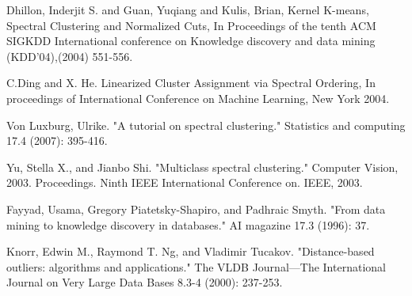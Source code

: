 \begin{thebibliography}{9}
Dhillon, Inderjit S. and Guan, Yuqiang and Kulis, Brian, Kernel K-means, Spectral Clustering and Normalized Cuts, In Proceedings of the tenth ACM SIGKDD International conference on Knowledge discovery and data mining (KDD’04),(2004) 551-556.

C.Ding and X. He. Linearized Cluster Assignment via Spectral Ordering, In proceedings of International Conference on Machine Learning, New York 2004.

Von Luxburg, Ulrike. "A tutorial on spectral clustering." Statistics and computing 17.4 (2007): 395-416.

Yu, Stella X., and Jianbo Shi. "Multiclass spectral clustering." Computer Vision, 2003. Proceedings. Ninth IEEE International Conference on. IEEE, 2003.

Fayyad, Usama, Gregory Piatetsky-Shapiro, and Padhraic Smyth. "From data mining to knowledge discovery in databases." AI magazine 17.3 (1996): 37.

Knorr, Edwin M., Raymond T. Ng, and Vladimir Tucakov. "Distance-based outliers: algorithms and applications." The VLDB Journal—The International Journal on Very Large Data Bases 8.3-4 (2000): 237-253.

\end{thebibliography}
